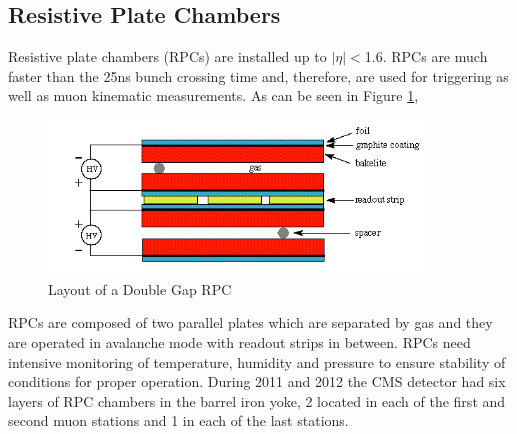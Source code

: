 \subsection{Resistive Plate Chambers}
Resistive plate chambers (RPCs) are installed up to $|\eta|<$1.6. 
RPCs are much faster than the 25ns bunch crossing time and, therefore,
are used for triggering as well as muon kinematic measurements. 
As can be seen in Figure \ref{fig:RPCsketch},
\begin{figure}[hb]
  \centering
	\includegraphics[width=0.9\textwidth]{images/RPCsketch.png}
  	\caption[RPC Sketch]
   	{Layout of a Double Gap RPC}
	\label{fig:RPCsketch}
\end{figure}
RPCs are composed
of two parallel plates which are separated by gas and they are operated in avalanche 
mode with readout strips in between. 
RPCs need intensive monitoring of temperature, humidity and pressure to ensure stability
of conditions for proper operation.
During 2011 and 2012 the CMS detector had six layers of RPC chambers in the barrel iron yoke,
2 located in each of the first and second muon stations and 1 in each of the last stations.
